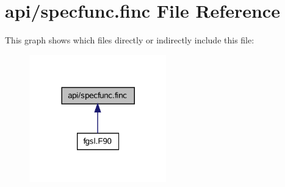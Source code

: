 \hypertarget{specfunc_8finc}{}\section{api/specfunc.finc File Reference}
\label{specfunc_8finc}
This graph shows which files directly or indirectly include this file\+:\nopagebreak
\begin{figure}[H]
\begin{center}
\leavevmode
\includegraphics[width=168pt]{specfunc_8finc__dep__incl}
\end{center}
\end{figure}
